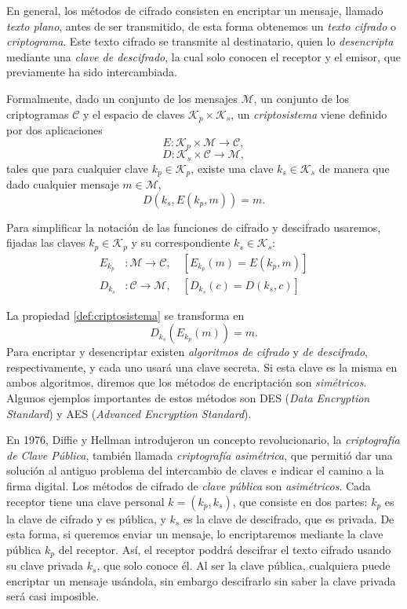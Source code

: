 En general, los métodos de cifrado consisten en encriptar un mensaje, llamado \emph{texto plano}, antes de ser transmitido, de esta forma obtenemos un \emph{texto cifrado} o \emph{criptograma}. Este texto cifrado se transmite al destinatario, quien lo \emph{desencripta} mediante una \emph{clave de descifrado}, la cual solo conocen el receptor y el emisor, que previamente ha sido intercambiada.

Formalmente, dado un conjunto de los mensajes $\mathcal{M}$, un conjunto de los criptogramas $\mathcal{C}$ y el espacio de claves $\mathcal{K}_p \times \mathcal{K}_s$, un \emph{criptosistema} viene definido por dos aplicaciones
\[
    E : \mathcal{K}_p \times \mathcal{M} \rightarrow \mathcal{C},
\]
\[
    D : \mathcal{K}_s \times \mathcal{C} \rightarrow \mathcal{M},
\]
tales que para cualquier clave $k_p \in \mathcal{K}_p$, existe una clave $k_s \in \mathcal{K}_s$ de manera que dado cualquier mensaje $m \in \mathcal{M}$,
\begin{equation}
    \label{def:criptosistema}
    D(k_s, E(k_p, m)) = m.
\end{equation}

Para simplificar la notación de las funciones de cifrado y descifrado usaremos, fijadas las claves $k_p \in \mathcal{K}_p$ y su correspondiente $k_s \in \mathcal{K}_s$:
\begin{align*} 
    E_{k_p} &: \mathcal{M} \rightarrow \mathcal{C}, \quad [ E_{k_p} (m) = E(k_p, m) ]\\ 
    D_{k_s} &: \mathcal{C} \rightarrow \mathcal{M}, \quad [ D_{k_s} (c) = D(k_s, c) ]
\end{align*}

La propiedad \ref{def:criptosistema} se transforma en
\[
    D_{k_s} \left( E_{k_p}(m) \right) = m.
\]
Para encriptar y desencriptar existen \emph{algoritmos de cifrado} y \emph{de descifrado}, respectivamente, y cada uno usará una clave secreta. Si esta clave es la misma en ambos algoritmos, diremos que los métodos de encriptación son \emph{simétricos}. Algunos ejemplos importantes de estos métodos son DES (\emph{Data Encryption Standard}) y AES (\emph{Advanced Encryption Standard}).

En 1976, Diffie y Hellman \cite{Diffie_Hellman_1976} introdujeron un concepto revolucionario, la \emph{criptografía de Clave Pública}, también llamada \emph{criptografía asimétrica}, que permitió dar una solución al antiguo problema del intercambio de claves e indicar el camino a la firma digital. Los métodos de cifrado de \emph{clave pública} son \emph{asimétricos}. Cada receptor tiene una clave personal $k = (k_p, k_s)$, que consiste en dos partes: $k_p$ es la clave de cifrado y es pública, y $k_s$ es la clave de descifrado, que es privada. De esta forma, si queremos enviar un mensaje, lo encriptaremos mediante la clave pública $k_p$ del receptor. Así, el receptor poddrá descifrar el texto cifrado usando su clave privada $k_s$, que solo conoce él. Al ser la clave pública, cualquiera puede encriptar un mensaje usándola, sin embargo descifrarlo sin saber la clave privada será casi imposible.

